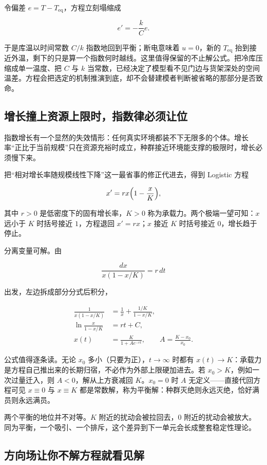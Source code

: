令偏差 \(e=T-T_{\mathrm{eq}}\)，方程立刻塌缩成

\[
e'=-\frac{k}{C}e.
\]

于是库温以时间常数 \(C/k\) 指数地回到平衡；断电意味着 \(u=0\)，新的 \(T_{\mathrm{eq}}\) 抬到接近外温，剩下的只是算一个指数何时越线。这里值得保留的不止解公式。把冷库压缩成单一温度、把 \(C\) 与 \(k\) 当常数，已经决定了模型看不见门边与货架深处的空间温差。方程会把选定的机制推演到底，却不会替建模者判断被省略的那部分是否致命。

\subsection{增长撞上资源上限时，指数律必须让位}

指数增长有一个显然的失效情形：任何真实环境都装不下无限多的个体。增长率``正比于当前规模''只在资源充裕时成立，种群接近环境能支撑的极限时，增长必须慢下来。

把``相对增长率随规模线性下降''这一最省事的修正代进去，得到 Logistic 方程

\[
x'=rx\Bigl(1-\frac{x}{K}\Bigr),
\]

其中 \(r>0\) 是低密度下的固有增长率，\(K>0\) 称为承载力。两个极端一望可知：\(x\) 远小于 \(K\) 时括号接近 \(1\)，方程退回 \(x'=rx\)；\(x\) 接近 \(K\) 时括号接近 \(0\)，增长趋于停止。

分离变量可解。由

\[
\frac{dx}{x(1-x/K)}=r\,dt
\]

出发，左边拆成部分分式后积分，

\[
\begin{aligned}
\frac{1}{x(1-x/K)}
&=\frac1x+\frac{1/K}{1-x/K},\\
\ln\frac{x}{1-x/K}
&=rt+C,\\
x(t)
&=\frac{K}{1+Ae^{-rt}},
\qquad
A=\frac{K-x_0}{x_0}.
\end{aligned}
\]

公式值得逐条读。无论 \(x_0\) 多小（只要为正），\(t\to\infty\) 时都有 \(x(t)\to K\)：承载力是方程自己推出来的长期归宿，不必作为外部上限硬加进去。若 \(x_0>K\)，例如一次过量迁入，则 \(A<0\)，解从上方衰减回 \(K\)。\(x_0=0\) 时 \(A\) 无定义——直接代回方程可见 \(x\equiv0\) 与 \(x\equiv K\) 都是常数解，称为平衡解：种群灭绝则永远灭绝，恰好满员则永远满员。

两个平衡的地位并不对等。\(K\) 附近的扰动会被拉回去，\(0\) 附近的扰动会被放大。同为平衡，一个吸引、一个排斥，这个差异到下一单元会长成整套稳定性理论。

\subsection{方向场让你不解方程就看见解}

